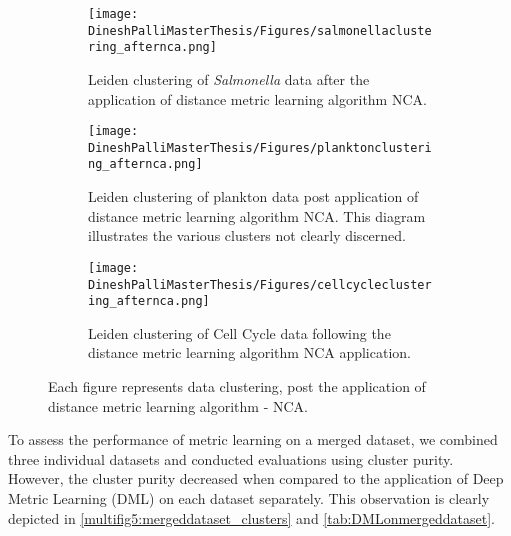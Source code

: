 \documentclass[12pt,a4paper]{article}
\begin{document}
\begin{figure}
  \centering
  \begin{subfigure}{\linewidth}
    \texttt{[image: DineshPalliMasterThesis/Figures/salmonellaclustering\_afternca.png]}
    \caption{Leiden clustering of \textit{Salmonella} data after the application of distance metric learning algorithm NCA.}
    \label{multifig4:image_a}
  \end{subfigure}
  \hfill
  \begin{subfigure}{\linewidth}
    \texttt{[image: DineshPalliMasterThesis/Figures/planktonclustering\_afternca.png]}
    \caption{Leiden clustering of plankton data post application of distance metric learning algorithm NCA. This diagram illustrates the various clusters not clearly discerned.}
    \label{multifig4:image_b}
  \end{subfigure}
  \hfill
  \begin{subfigure}{\linewidth}
    \texttt{[image: DineshPalliMasterThesis/Figures/cellcycleclustering\_afternca.png]}
    \caption{Leiden clustering of Cell Cycle data following the distance metric learning algorithm NCA application.}
    \label{multifig4:image_c}
  \end{subfigure}
  \caption{Each figure represents data clustering, post the application of distance metric learning algorithm - NCA.}
  \label{multifig4:DML_Clusters}
\end{figure}


To assess the performance of metric learning on a merged dataset, we combined three individual datasets and conducted evaluations using cluster purity. However, the cluster purity decreased when compared to the application of Deep Metric Learning (DML) on each dataset separately. This observation is clearly depicted in \ref{multifig5:mergeddataset_clusters} and \ref{tab:DMLonmergeddataset}.
\end{document}
